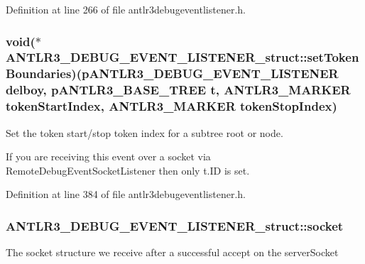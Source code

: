 Definition at line 266 of file antlr3debugeventlistener.\-h.

\hypertarget{struct_a_n_t_l_r3___d_e_b_u_g___e_v_e_n_t___l_i_s_t_e_n_e_r__struct_a9b01b22f92c496a1eb48f0d8c1efeae0}{
\subsubsection[{set\-Token\-Boundaries}]{\setlength{\rightskip}{0pt plus 5cm}void($\ast$ A\-N\-T\-L\-R3\-\_\-\-D\-E\-B\-U\-G\-\_\-\-E\-V\-E\-N\-T\-\_\-\-L\-I\-S\-T\-E\-N\-E\-R\-\_\-struct\-::set\-Token\-Boundaries)({\bf p\-A\-N\-T\-L\-R3\-\_\-\-D\-E\-B\-U\-G\-\_\-\-E\-V\-E\-N\-T\-\_\-\-L\-I\-S\-T\-E\-N\-E\-R} delboy, {\bf p\-A\-N\-T\-L\-R3\-\_\-\-B\-A\-S\-E\-\_\-\-T\-R\-E\-E} {\bf t}, {\bf A\-N\-T\-L\-R3\-\_\-\-M\-A\-R\-K\-E\-R} token\-Start\-Index, {\bf A\-N\-T\-L\-R3\-\_\-\-M\-A\-R\-K\-E\-R} token\-Stop\-Index)}}\label{struct_a_n_t_l_r3___d_e_b_u_g___e_v_e_n_t___l_i_s_t_e_n_e_r__struct_a9b01b22f92c496a1eb48f0d8c1efeae0}
Set the token start/stop token index for a subtree root or node.

If you are receiving this event over a socket via Remote\-Debug\-Event\-Socket\-Listener then only t.\-I\-D is set. 

Definition at line 384 of file antlr3debugeventlistener.\-h.

\hypertarget{struct_a_n_t_l_r3___d_e_b_u_g___e_v_e_n_t___l_i_s_t_e_n_e_r__struct_aed6e688364e4ff83067f57e436356a54}{
\subsubsection[{socket}]{ A\-N\-T\-L\-R3\-\_\-\-D\-E\-B\-U\-G\-\_\-\-E\-V\-E\-N\-T\-\_\-\-L\-I\-S\-T\-E\-N\-E\-R\-\_\-struct\-::socket}}\label{struct_a_n_t_l_r3___d_e_b_u_g___e_v_e_n_t___l_i_s_t_e_n_e_r__struct_aed6e688364e4ff83067f57e436356a54}
The socket structure we receive after a successful accept on the server\-Socket 

